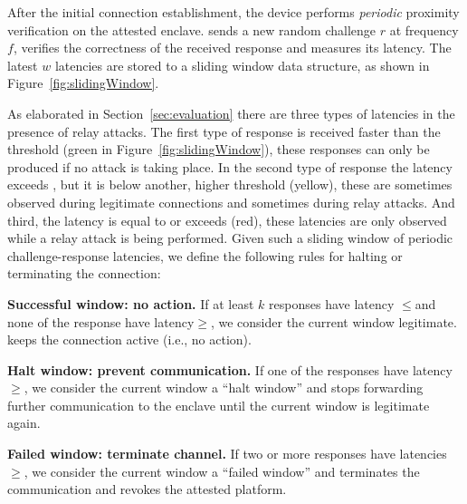 \ifusenix
\vspace{-14pt}
\else
\fi
{} After the initial connection establishment, the \device device performs \emph{periodic} proximity verification on the attested enclave. \device sends a new random challenge $r$ at frequency $f$, verifies the correctness of the received response and measures its latency. The latest $w$ latencies are stored to a sliding window data structure, as shown in Figure~\ref{fig:slidingWindow}.

As elaborated in Section~\ref{sec:evaluation} there are three types of latencies in the presence of relay attacks. The first type of response is received faster than the  threshold \connect (green in Figure~\ref{fig:slidingWindow}), these responses can only be produced if no attack is taking place. In the second type of response the latency exceeds \connect, but it is below another, higher threshold \detach (yellow), these are sometimes observed during legitimate connections and sometimes during relay attacks. And third, the latency is equal to or exceeds \detach (red), these latencies are only observed while a relay attack is being performed. Given such a sliding window of periodic challenge-response latencies, we define the following rules for halting or terminating the connection:

\begin{mylist}
  \item \textbf{Successful window: no action.} If at least $k$ responses have latency $\leq$\connect and none of the response have latency$\geq$\detach, we consider the current window legitimate. \device keeps the connection active (i.e., no action).
 
  \item \textbf{Halt window: prevent communication.} If one of the responses have latency $\geq$\detach, we consider the current window a ``halt window'' and \device stops forwarding further communication to the enclave until the current window is legitimate again.

  \item \textbf{Failed window: terminate channel.} If two or more responses have latencies $\geq$\detach, we consider the current window a ``failed window'' and \device terminates the communication and revokes the attested platform.
\end{mylist}


\iffalse
\myparagraph{Following communication.}
After attestation, \device performs proximity verification with the attested enclave periodically at frequency $f$ (e.g., $f=1/s$). If the proximity verification fails, \device tries immediately again. If proximity verification fails a threshold $T$ number of times successively (e.g., $T=10$), \device determines that it must have been detached and it prevents further communication with the attested enclave. In Section~\ref{sec:evaluation} discuss parameter values for $f$ and $T$.
\fi

